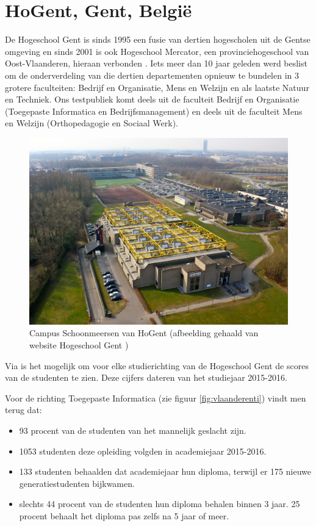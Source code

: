 \section{HoGent, Gent, België}
\label{sec:hogent}

De Hogeschool Gent is sinds 1995 een fusie van dertien hogescholen uit de Gentse omgeving en sinds 2001 is ook Hogeschool Mercator, een provinciehogeschool van Oost-Vlaanderen, hieraan verbonden \autocite{HoGent2018}. Iets meer dan 10 jaar geleden werd beslist om de onderverdeling van die dertien departementen opnieuw te bundelen in 3 grotere faculteiten: Bedrijf en Organisatie, Mens en Welzijn en als laatste Natuur en Techniek. Ons testpubliek komt deels uit de faculteit Bedrijf en Organisatie (Toegepaste Informatica en Bedrijfsmanagement) en deels uit de faculteit Mens en Welzijn (Orthopedagogie en Sociaal Werk). 

\begin{figure}[!h]
	\includegraphics[width=\textwidth]
	{img/campus_hogent.JPG}
	\caption{Campus Schoonmeersen van HoGent (afbeelding gehaald van website Hogeschool Gent \autocite{Gent2018})}
	\label{fig:campushogent}
\end{figure}

Via \textcite{Onderwijs.vlaanderen.be2017} is het mogelijk om voor elke studierichting van de Hogeschool Gent de scores van de studenten te zien. Deze cijfers dateren van het studiejaar 2015-2016. 

Voor de richting Toegepaste Informatica (zie figuur \ref{fig:vlaanderenti}) vindt men terug dat:
\begin{itemize}
	\item 93 procent van de studenten van het mannelijk geslacht zijn.
	\item 1053 studenten deze opleiding volgden in academiejaar 2015-2016.
	\item 133 studenten behaalden dat academiejaar hun diploma, terwijl er 175 nieuwe generatiestudenten bijkwamen.
	\item slechts 44 procent van de studenten hun diploma behalen binnen 3 jaar. 25 procent behaalt het diploma pas zelfs na 5 jaar of meer.
\end{itemize}


